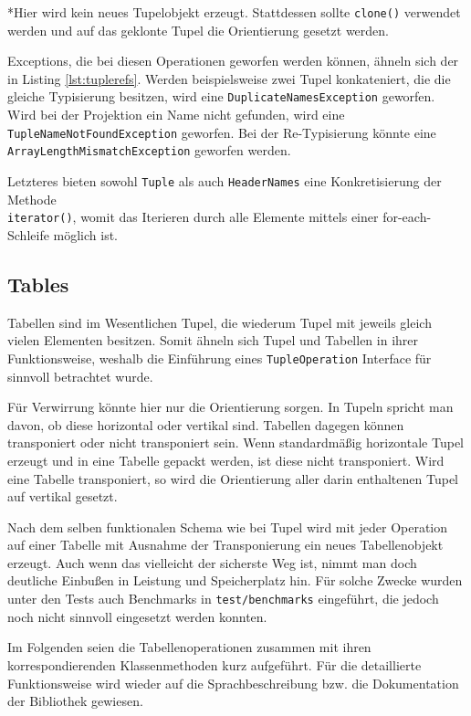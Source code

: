 *Hier wird kein neues Tupelobjekt erzeugt. Stattdessen sollte \lstinline{clone()} verwendet werden und auf das geklonte Tupel die Orientierung gesetzt werden.

Exceptions, die bei diesen Operationen geworfen werden können, ähneln sich der in Listing \ref{lst:tuplerefs}. Werden
beispielsweise zwei Tupel konkateniert, die die gleiche Typisierung besitzen, wird eine \lstinline{DuplicateNamesException} geworfen.
Wird bei der Projektion ein Name nicht gefunden, wird eine \lstinline{TupleNameNotFoundException} geworfen. Bei der Re-Typisierung
könnte eine\\
\lstinline{ArrayLengthMismatchException} geworfen werden.

Letzteres bieten sowohl \lstinline{Tuple} als auch \lstinline{HeaderNames} eine Konkretisierung der Methode\\
\lstinline{iterator()}, womit
das Iterieren durch alle Elemente mittels einer for-each-Schleife möglich ist.

\subsection{Tables}

Tabellen sind im Wesentlichen Tupel, die wiederum Tupel mit jeweils gleich vielen Elementen besitzen.
Somit ähneln sich Tupel und Tabellen in ihrer Funktionsweise, weshalb die Einführung eines \lstinline{TupleOperation} Interface für sinnvoll betrachtet wurde.

Für Verwirrung könnte hier nur die Orientierung sorgen. In Tupeln spricht man davon, ob diese horizontal oder vertikal sind.
Tabellen dagegen können transponiert oder nicht transponiert sein. Wenn standardmäßig horizontale Tupel erzeugt und in eine Tabelle
gepackt werden, ist diese nicht transponiert. Wird eine Tabelle transponiert, so wird die Orientierung aller darin enthaltenen Tupel
auf vertikal gesetzt.

Nach dem selben funktionalen Schema wie bei Tupel wird mit jeder Operation auf einer Tabelle mit Ausnahme der Transponierung
ein neues Tabellenobjekt erzeugt. Auch wenn das vielleicht der sicherste Weg ist, nimmt man doch deutliche Einbußen in Leistung
und Speicherplatz hin. Für solche Zwecke wurden unter den Tests auch Benchmarks in \texttt{test/benchmarks} eingeführt, die jedoch
noch nicht sinnvoll eingesetzt werden konnten.

Im Folgenden seien die Tabellenoperationen zusammen mit ihren korrespondierenden Klassenmethoden kurz aufgeführt.
Für die detaillierte Funktionsweise wird wieder auf die Sprachbeschreibung bzw. die Dokumentation der Bibliothek gewiesen.

